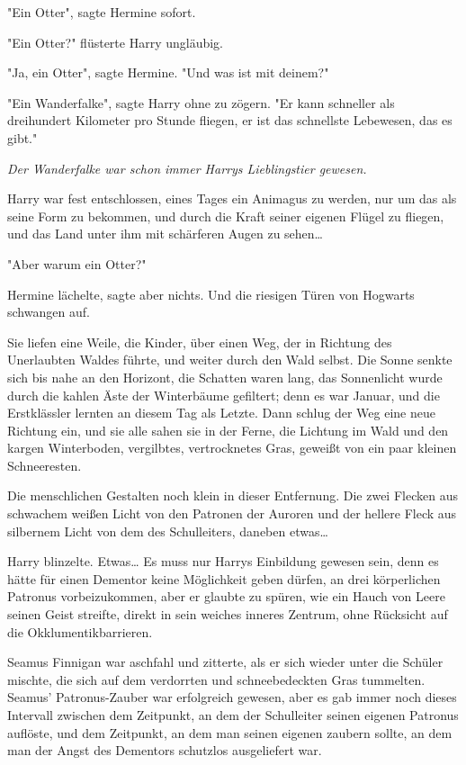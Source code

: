 {"Ein Otter", sagte Hermine sofort.

"Ein Otter?" flüsterte Harry ungläubig.

"Ja, ein Otter", sagte Hermine. "Und was ist mit deinem?"

"Ein Wanderfalke", sagte Harry ohne zu zögern. "Er kann schneller als dreihundert Kilometer pro Stunde fliegen, er ist das schnellste Lebewesen, das es gibt."

\emph{Der Wanderfalke war schon immer Harrys Lieblingstier gewesen.}

Harry war fest entschlossen, eines Tages ein Animagus zu werden, nur um das als seine Form zu bekommen, und durch die Kraft seiner eigenen Flügel zu fliegen, und das Land unter ihm mit schärferen Augen zu sehen…

"Aber warum ein Otter?"

Hermine lächelte, sagte aber nichts. Und die riesigen Türen von Hogwarts schwangen auf.

Sie liefen eine Weile, die Kinder, über einen Weg, der in Richtung des Unerlaubten Waldes führte, und weiter durch den Wald selbst. Die Sonne senkte sich bis nahe an den Horizont, die Schatten waren lang, das Sonnenlicht wurde durch die kahlen Äste der Winterbäume gefiltert; denn es war Januar, und die Erstklässler lernten an diesem Tag als Letzte. Dann schlug der Weg eine neue Richtung ein, und sie alle sahen sie in der Ferne, die Lichtung im Wald und den kargen Winterboden, vergilbtes, vertrocknetes Gras, geweißt von ein paar kleinen Schneeresten.

Die menschlichen Gestalten noch klein in dieser Entfernung. Die zwei Flecken aus schwachem weißen Licht von den Patronen der Auroren und der hellere Fleck aus silbernem Licht von dem des Schulleiters, daneben etwas…

Harry blinzelte. Etwas… Es muss nur Harrys Einbildung gewesen sein, denn es hätte für einen Dementor keine Möglichkeit geben dürfen, an drei körperlichen Patronus vorbeizukommen, aber er glaubte zu spüren, wie ein Hauch von Leere seinen Geist streifte, direkt in sein weiches inneres Zentrum, ohne Rücksicht auf die Okklumentikbarrieren.

Seamus Finnigan war aschfahl und zitterte, als er sich wieder unter die Schüler mischte, die sich auf dem verdorrten und schneebedeckten Gras tummelten. Seamus' Patronus-Zauber war erfolgreich gewesen, aber es gab immer noch dieses Intervall zwischen dem Zeitpunkt, an dem der Schulleiter seinen eigenen Patronus auflöste, und dem Zeitpunkt, an dem man seinen eigenen zaubern sollte, an dem man der Angst des Dementors schutzlos ausgeliefert war.

}
